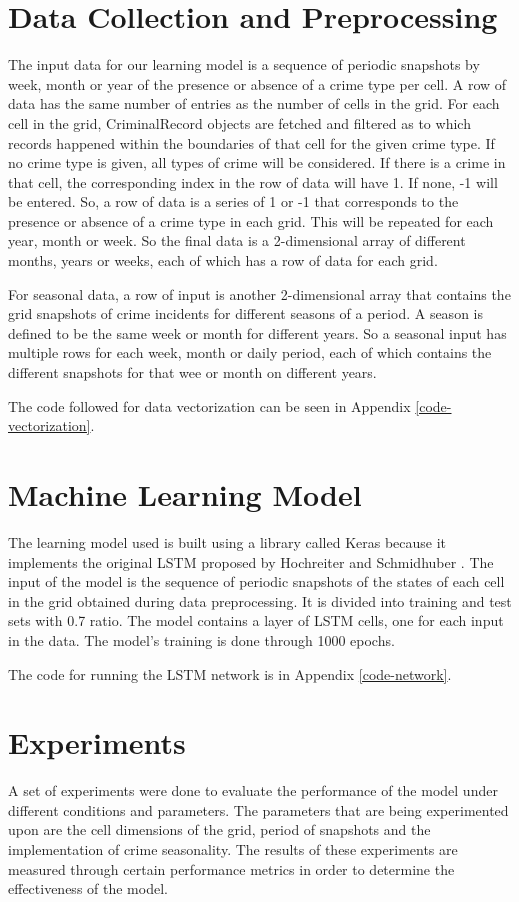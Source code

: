\section{Data Collection and Preprocessing}
    The input data for our learning model is a sequence of periodic snapshots by week, month or year of the presence or absence of a crime type per cell. A row of data has the same number of entries as the number of cells in the grid. For each cell in the grid, CriminalRecord objects are fetched and filtered as to which records happened within the boundaries of that cell for the given crime type. If no crime type is given, all types of crime will be considered. If there is a crime in that cell, the corresponding index in the row of data will have 1. If none, -1 will be entered. So, a row of data is a series of 1 or -1 that corresponds to the presence or absence of a crime type in each grid. This will be repeated for each year, month or week. So the final data is a 2-dimensional array of different months, years or weeks, each of which has a row of data for each grid.

    For seasonal data, a row of input is another 2-dimensional array that contains the grid snapshots of crime incidents for different seasons of a period. A season is defined to be the same week or month for different years. So a seasonal input has multiple rows for each week, month or daily period, each of which contains the different snapshots for that wee or month on different years.

    The code followed for data vectorization can be seen in Appendix \ref{code-vectorization}.

\section{Machine Learning Model}
    The learning model used is built using a library called Keras because it implements the original LSTM proposed by Hochreiter and Schmidhuber \citeyearpar{hochreiter1997long}. The input of the model is the sequence of periodic snapshots of the states of each cell in the grid obtained during data preprocessing. It is divided into training and test sets with 0.7 ratio. The model contains a layer of LSTM cells, one for each input in the data. The model's training is done through 1000 epochs.

    The code for running the LSTM network is in Appendix \ref{code-network}.

\section{Experiments}
    A set of experiments were done to evaluate the performance of the model under different conditions and parameters. The parameters that are being experimented upon are the cell dimensions of the grid, period of snapshots and the implementation of crime seasonality. The results of these experiments are measured through certain performance metrics in order to determine the effectiveness of the model.


